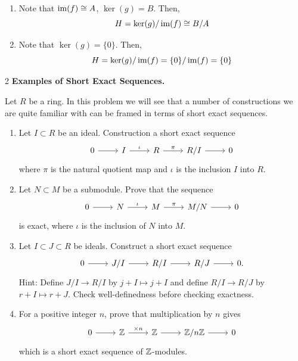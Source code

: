\documentclass[Notebook.tex]{subfiles}
\begin{document}
\begin{solution}
\begin{enumerate}
\begin{enumerate}
            \item Note that $\operatorname{im}(f) \cong A$, $\ker(g) = B$. Then, 
            \[H = \ker(g)/\operatorname{im}(f) \cong B/A \]

            \item Note that $\ker(g) = \{0\}$. Then, 
            \[H = \ker(g)/\operatorname{im}(f) = \{0\}/\operatorname{im}(f) = \{0\}\]
        \end{enumerate} 
    \end{enumerate}
\end{solution}

\newpage

\begin{problem}{2} \textbf{Examples of Short Exact Sequences.} 

    Let $R$ be a ring. In this problem we will see that a number of constructions we are quite familiar with can be framed in terms of short exact sequences. 
    \begin{enumerate}
    \item Let $I \subset R$ be an ideal. Construction a short exact sequence
        \[
        \begin{tikzcd}
        0 \arrow[r] & I \arrow[r, "\iota"] & R \arrow[r, "\pi"] & R/I \arrow[r] & 0
        \end{tikzcd}
        \]
        where $\pi$ is the natural quotient map and $\iota$ is the inclusion $I$ into $R$. 
        \item Let $N\subset M$ be a submodule. Prove that the sequence
        \[
        \begin{tikzcd}
        0 \arrow[r] & N \arrow[r, "\iota"] & M \arrow[r, "\pi"] & M/N \arrow[r] & 0
        \end{tikzcd}
        \]
        is exact, where $\iota$ is the inclusion of $N$ into $M$. 
        \item Let $I\subset J\subset R$ be ideals. Construct a short exact sequence
        \[
        \begin{tikzcd}
        0 \arrow[r] & J/I \arrow[r] & R/I \arrow[r] & R/J \arrow[r] & 0.
        \end{tikzcd}
        \]
        Hint: Define $J/I\to R/I$ by $j+I\mapsto j+I$ and define $R/I\to R/J$ by $r+I\mapsto r+J$. Check well-definedness before checking exactness.
        \item For a positive integer $n$, prove that multiplication by $n$ gives
        \[
        \begin{tikzcd}
        0 \arrow[r] & \Z \arrow[r, "\times n"] & \Z \arrow[r] & \Z/n\Z \arrow[r] & 0
        \end{tikzcd}
        \]
        which is a short exact sequence of $\mathbb Z$-modules.
    \end{enumerate}
\end{problem}
\end{document}
